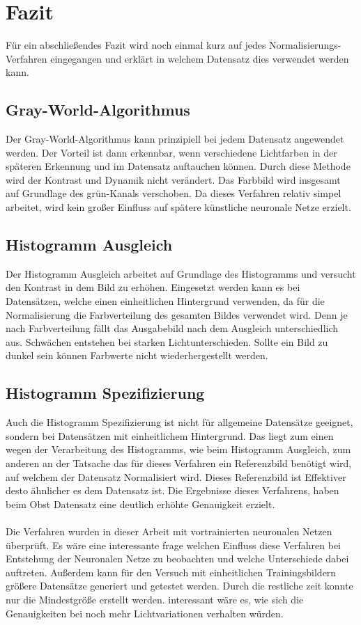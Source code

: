 \documentclass[a4paper,12pt,oneside]{article}
\begin{document}
  \section{Fazit}\label{s.fazit}
Für ein abschließendes Fazit wird noch einmal kurz auf jedes Normalisierungs-Verfahren eingegangen und erklärt in welchem Datensatz dies verwendet werden kann.
\subsection{Gray-World-Algorithmus}
Der Gray-World-Algorithmus kann prinzipiell bei jedem Datensatz angewendet werden. Der Vorteil ist dann erkennbar, wenn verschiedene Lichtfarben in der späteren Erkennung und im Datensatz auftauchen können. Durch diese Methode wird der Kontrast und Dynamik nicht verändert. Das Farbbild wird insgesamt auf Grundlage des grün-Kanals verschoben. Da dieses Verfahren relativ simpel arbeitet, wird kein großer Einfluss auf spätere künstliche neuronale Netze erzielt.
\subsection{Histogramm Ausgleich}
Der Histogramm Ausgleich arbeitet auf Grundlage des Histogramms und versucht den Kontrast in dem Bild zu erhöhen. Eingesetzt werden kann es bei Datensätzen, welche einen einheitlichen Hintergrund verwenden, da für die Normalisierung die Farbverteilung  des gesamten Bildes verwendet wird. Denn je nach Farbverteilung fällt das Ausgabebild nach dem Ausgleich unterschiedlich aus. Schwächen entstehen bei starken Lichtunterschieden. Sollte ein Bild zu dunkel sein können Farbwerte nicht wiederhergestellt werden.
\subsection{Histogramm Spezifizierung}
Auch die Histogramm Spezifizierung ist nicht für allgemeine Datensätze geeignet, sondern bei Datensätzen mit einheitlichem Hintergrund. Das liegt zum einen wegen der Verarbeitung des Histogramms, wie beim Histogramm Ausgleich, zum anderen an der Tatsache das für dieses Verfahren ein Referenzbild benötigt wird, auf welchem der Datensatz Normalisiert wird. Dieses Referenzbild ist Effektiver desto ähnlicher es dem Datensatz ist. Die Ergebnisse dieses Verfahrens, haben beim Obst Datensatz eine deutlich erhöhte Genauigkeit erzielt.\\\\
Die Verfahren wurden in dieser Arbeit mit vortrainierten neuronalen Netzen überprüft. Es wäre eine interessante frage welchen Einfluss diese Verfahren bei Entstehung der Neuronalen Netze zu beobachten und welche Unterschiede dabei auftreten. Außerdem kann für den Versuch mit einheitlichen Trainingsbildern größere Datensätze generiert und getestet werden. Durch die restliche zeit konnte nur die Mindestgröße erstellt werden. interessant wäre es, wie sich die Genauigkeiten bei noch mehr Lichtvariationen verhalten würden.  
  \newpage
  \printbibliography
  \newpage
\end{document}

